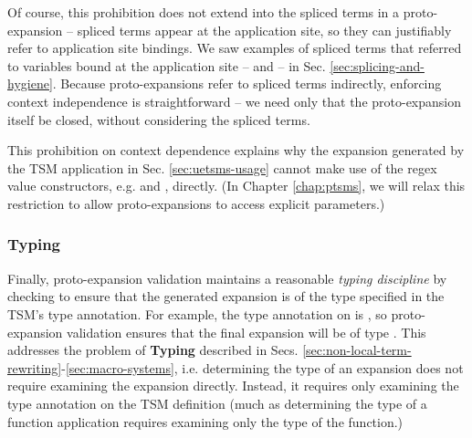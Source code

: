 Of course, this prohibition does not extend into the spliced terms in a proto-expansion -- spliced terms appear at the application site, so they can justifiably refer to application site bindings. We saw examples of spliced terms that referred to variables bound at the application site  --  and  -- in Sec. \ref{sec:splicing-and-hygiene}. Because proto-expansions refer to spliced terms indirectly, enforcing context independence is straightforward -- we need only that the proto-expansion itself be closed, without considering the spliced terms.%

This prohibition on context dependence explains why the expansion generated by the TSM application in Sec. \ref{sec:uetsms-usage} cannot make use of the regex value constructors, e.g.  and , directly. (In Chapter \ref{chap:ptsms}, we will relax this restriction to allow proto-expansions to access explicit parameters.)


\subsubsection{Typing}
Finally, proto-expansion validation maintains a reasonable \emph{typing discipline} by checking to ensure that the generated expansion is of the type specified in the TSM's type annotation. For example, the type annotation on  is , so proto-expansion validation ensures that the final expansion will be of type . This addresses the problem of \textbf{Typing} described in Secs. \ref{sec:non-local-term-rewriting}-\ref{sec:macro-systems}, i.e. determining the type of an expansion does not require examining the expansion directly. Instead, it requires only examining the type annotation on the TSM definition (much as determining the type of a function application requires examining only the type of the function.)


